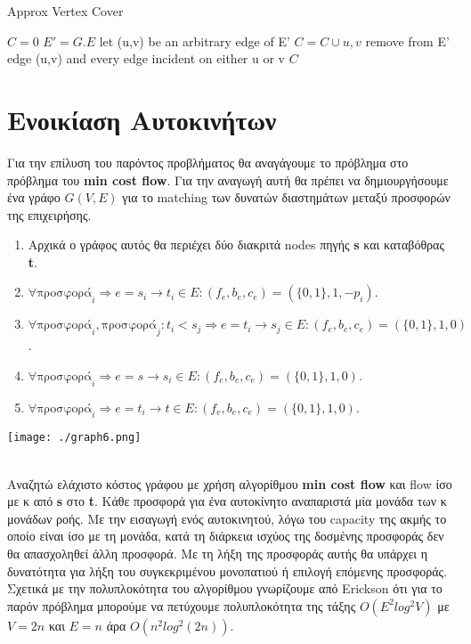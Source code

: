\documentclass{article}
\begin{document}
\begin{algorithm}
    \caption{Approx Vertex Cover} 
    \begin{algorithmic}[1]
        \State $C = 0$
        \State $E' = G.E$
            \State let (u,v) be an arbitrary edge of E'
            \State $C = C\cup {u,v}$
            \State remove from E' edge (u,v) and every edge incident on either u or v
        \EndWhile
        \Return $C$

    \end{algorithmic}
\end{algorithm}


\pagebreak
\section{Ενοικίαση Αυτοκινήτων}
Για την επίλυση του παρόντος προβλήματος θα αναγάγουμε το πρόβλημα στο πρόβλημα του \textbf{min cost flow}.
Για την αναγωγή αυτή θα πρέπει να δημιουργήσουμε ένα γράφο $G(V,E)$ για το matching των δυνατών διαστημάτων
μεταξύ προσφορών της επιχειρήσης. \\
\begin{enumerate}
    \item{Αρχικά ο γράφος αυτός θα περιέχει δύο διακριτά nodes πηγής \textbf{s} και καταβόθρας \textbf{t}.}
    \item{$\forall \text{προσφορά}_i \Rightarrow e = s_i \rightarrow t_i \in E:(f_e,b_e,c_e) = 
        (\{0,1\},1,-p_i)$.}
    \item{$\forall \text{προσφορά}_i,\text{προσφορά}_j:t_i < s_j \Rightarrow e = t_i \rightarrow s_j\in E:
        (f_e,b_e,c_e) = (\{0,1\},1,0)$.}
    \item{$\forall \text{προσφορά}_i \Rightarrow e = s \rightarrow s_i\in Ε:(f_e,b_e,c_e) = (\{0,1\},1,0)$.}
    \item{$\forall \text{προσφορά}_i \Rightarrow e = t_i \rightarrow t\in Ε:(f_e,b_e,c_e) = (\{0,1\},1,0)$.}
\end{enumerate}

\begin{center}
    \texttt{[image: ./graph6.png]}
\end{center} \\ 

Αναζητώ ελάχιστο κόστος γράφου με χρήση αλγορίθμου \textbf{min cost flow} και flow ίσο με κ από
\textbf{s} στο \textbf{t}. Κάθε προσφορά για ένα αυτοκίνητο αναπαριστά μία μονάδα των κ μονάδων ροής. 
Με την εισαγωγή ενός αυτοκινητού, λόγω του capacity της ακμής το οποίο είναι ίσο με τη μονάδα, κατά 
τη διάρκεια ισχύος της δοσμένης προσφοράς δεν θα απασχοληθεί άλλη προσφορά. Με τη λήξη της προσφοράς
αυτής θα υπάρχει η δυνατότητα για λήξη του συγκεκριμένου μονοπατιού ή επιλογή επόμενης προσφοράς.\\

Σχετικά με την πολυπλοκότητα του αλγορίθμου γνωρίζουμε από Erickson \cite{minCostFlow} ότι για το παρόν
πρόβλημα μπορούμε να πετύχουμε πολυπλοκότητα της τάξης $O(E^2log^2V)$ με $V = 2n$ και $Ε = n$ άρα 
$O(n^2log^2(2n))$.

\pagebreak
\printbibliography
\end{document}
